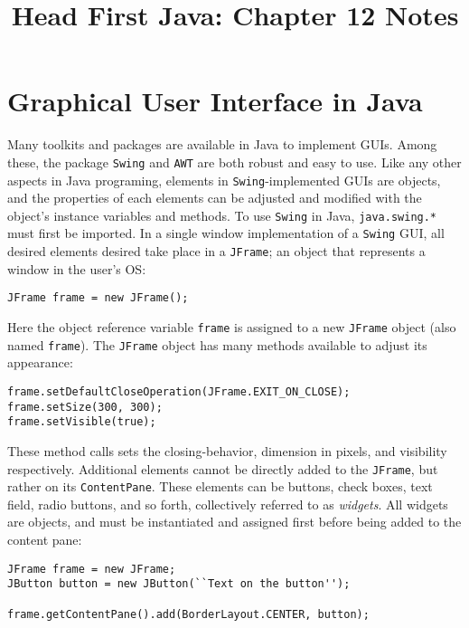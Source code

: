 \documentclass{tufte-handout}
\title{Head First Java: Chapter 12 Notes}
\begin{document}
    \maketitle

    \section*{Graphical User Interface in Java}
    Many toolkits and packages are available in Java to implement GUIs. Among these, the package \texttt{Swing} and \texttt{AWT} are both robust and easy to use. Like any other aspects in Java programing, elements in \texttt{Swing}-implemented GUIs are objects, and the properties of each elements can be adjusted and modified with the object's instance variables and methods. To use \texttt{Swing} in Java, \texttt{java.swing.*} must first be imported. In a single window implementation of a \texttt{Swing} GUI, all desired elements desired take place in a \texttt{JFrame}; an object that represents a window in the user's OS:

    \begin{lstlisting}
JFrame frame = new JFrame();
    \end{lstlisting}

    Here the object reference variable \texttt{frame} is assigned to a new \texttt{JFrame} object (also named \texttt{frame}). The \texttt{JFrame} object has many methods available to adjust its appearance:

    \begin{lstlisting}
frame.setDefaultCloseOperation(JFrame.EXIT_ON_CLOSE);
frame.setSize(300, 300);
frame.setVisible(true);
    \end{lstlisting}

    These method calls sets the closing-behavior, dimension in pixels, and visibility respectively. Additional elements cannot be directly added to the \texttt{JFrame}, but rather on its \texttt{ContentPane}. These elements can be buttons, check boxes, text field, radio buttons, and so forth, collectively referred to as \emph{widgets}. All widgets are objects, and must be instantiated and assigned first before being added to the content pane:

    \begin{lstlisting}
JFrame frame = new JFrame;
JButton button = new JButton(``Text on the button'');

frame.getContentPane().add(BorderLayout.CENTER, button);
    \end{lstlisting}
\end{document}
